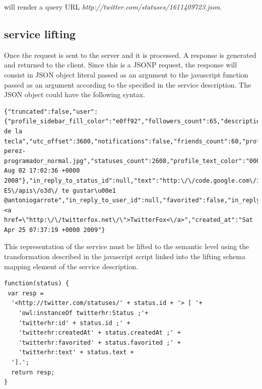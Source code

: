 will render a query URL \emph{http://twitter.com/statuses/1611409723.json}.

\subsection{service lifting}

Once the request is sent to the server and it is processed. A response is generated and returned to the client. Since this is a JSONP request, the response will consist in JSON object literal passed as an argument to the javascript function passed as an argument according to the specified in the service description. The JSON object could have the following syntax.
\vspace{5 mm}
\begin{lstlisting}
{"truncated":false,"user":{"profile_sidebar_fill_color":"e0ff92","followers_count":65,"description":"mozo de la tecla","utc_offset":3600,"notifications":false,"friends_count":60,"profile_sidebar_border_color":"87bc44","following":false,"url":"http:\/\/blep.blogspot.com","name":"luisperez","favourites_count":1,"profile_background_color":"9ae4e8","protected":false,"profile_image_url":"http:\/\/s3.amazonaws.com\/twitter_production\/profile_images\/57635124\/luis-perez-programador_normal.jpg","statuses_count":2608,"profile_text_color":"000000","screen_name":"luisperez","profile_background_tile":false,"profile_background_image_url":"http:\/\/static.twitter.com\/images\/themes\/theme1\/bg.gif","profile_link_color":"0000ff","location":"Valladolid","id":16742706,"time_zone":"Madrid","created_at":"Sat Aug 02 17:02:36 +0000 2008"},"in_reply_to_status_id":null,"text":"http:\/\/code.google.com\/intl\/es-ES\/apis\/o3d\/ te gustar\u00e1 @antoniogarrote","in_reply_to_user_id":null,"favorited":false,"in_reply_to_screen_name":null,"id":1611409723,"source":"<a href=\"http:\/\/twitterfox.net\/\">TwitterFox<\/a>","created_at":"Sat Apr 25 07:37:19 +0000 2009"}
\end{lstlisting} \vspace{5 mm}

This representation of the service must be lifted to the semantic level using the transformation described in the javascript script linked into the lifting schema mapping element of the service description.
\vspace{5 mm}
\begin{lstlisting}
function(status) {
 var resp = 
  '<http://twitter.com/statuses/' + status.id + '> [ '+
    'owl:instanceOf twitterhr:Status ;'+
    'twitterhr:id' + status.id ;' +
    'twitterhr:createdAt' + status.createdAt ;' +
    'twitterhr:favorited' + status.favorited ;' +
    'twitterhr:text' + status.text +
  '].';
  return resp;
}
\end{lstlisting} \vspace{5 mm}

